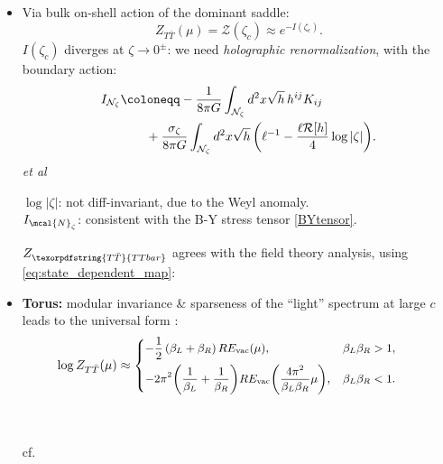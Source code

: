 \documentclass[10pt]{article}
\newcommand{\citations}[1]{{\footnotesize#1\par}}
\newcommand{\TTbar}{\texorpdfstring{\ensuremath{T\bar{T}}}{TTbar}\xspace}
\begin{document}
\begin{multicols}{3}
\begin{itemize}
\item Via bulk on-shell action of the dominant saddle:
	\begin{equation}
		Z_{T\bar T} (\mu) = \mathcal Z (\zeta_c) \approx  e^{-I(\zeta_c)}. \label{partition2}
	\end{equation}
$I(\zeta_c)$ \mbox{diverges} at $\zeta \to 0^\pm$: we need \textit{holographic renormalization}, with the boundary action:
	\begin{align}
		I_{\mathcal N_{\zeta}} & \coloneqq  - \frac{1}{8\pi G} \int_{\mathcal N_{\zeta}} d^2x \sqrt{h}\,h^{ij} K_{ij} \label{boundaryaction}
	\\& \qquad + \frac{\sigma_\zeta}{8\pi G} \int_{\mathcal N_{\zeta}} d^2x \sqrt{h} \, \bigg(\ell^{-1} - \frac{\ell  \mathcal{R}[h]}{4} \log |\zeta| \bigg). \notag
	\end{align}
	\hfill{\footnotesize \textcite{Henningson:1998gx} \textit{et al}}

	$\log |\zeta|$: not diff-invariant, due to the Weyl anomaly. \\
	$I_{\mcal{N}_\zeta}$: consistent with the B-Y stress tensor \eqref{BYtensor}.
	
	$Z_{\TTbar}$ agrees with the field theory analysis, using \eqref{eq:state_dependent_map}:

\item \textbf{Torus:} {modular invariance} \& sparseness of the ``light'' spectrum at large $c$ leads to the universal form :
	\begin{equation*}\small
	\hspace{-2em}
		\log   Z_{T\bar T}(\mu)  \approx \left\{ \begin{aligned}
		& {-\frac{1}{2}}\,(\beta_L + \beta_R)\, RE_{\text{vac}}(\mu),  &\beta_L \beta_R > 1, \\
		& {-2 \pi^2 \bigg(\frac{1}{\beta_L} + \frac{1}{\beta_R}\bigg)  RE_{\text{vac}}\bigg(\frac{4\pi^2}{\beta_L \beta_R} \mu \bigg)},  &\beta_L\beta_R < 1. %
		 \end{aligned} \right. %
	\end{equation*}
	\citations{\noindent%
		\textcite{Datta:2018thy}\\
		\textcite{Apolo:2023aho}\\
		cf.~\textcite{Hartman:2014oaa}
	}


\end{itemize}
\end{multicols}
\end{document}
